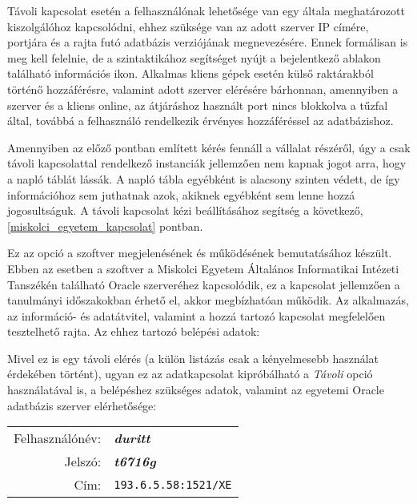 	\label{tavoli_kapcsolat}

Távoli kapcsolat esetén a felhasználónak lehetősége van egy általa meghatározott kiszolgálóhoz kapcsolódni, ehhez szüksége van az adott szerver IP címére, portjára és a rajta futó adatbázis verziójának megnevezésére. Ennek formálisan is meg kell felelnie, de a szintaktikához segítséget nyújt a bejelentkező ablakon található információs ikon. Alkalmas kliens gépek esetén külső raktárakból történő hozzáférésre, valamint adott szerver elérésére bárhonnan, amennyiben a szerver és a kliens online, az átjáráshoz használt port nincs blokkolva a tűzfal által, továbbá a felhasználó rendelkezik érvényes hozzáféréssel az adatbázishoz.\par
\setlength{\parindent}{12.5mm}Amennyiben az előző pontban említett kérés fennáll a vállalat részéről, úgy a csak távoli kapcsolattal rendelkező instanciák jellemzően nem kapnak jogot arra, hogy a napló táblát lássák. A napló tábla egyébként is alacsony szinten védett, de így információhoz sem juthatnak azok, akiknek egyébként sem lenne hozzá jogosultságuk.
\vskip 0.5cm
A távoli kapcsolat kézi beállításához segítség a következő, \ref{miskolci_egyetem_kapcsolat} pontban.


	\label{miskolci_egyetem_kapcsolat}
Ez az opció a szoftver megjelenésének és működésének bemutatásához készült. Ebben az esetben a szoftver a Miskolci Egyetem Általános Informatikai Intézeti Tanszékén található Oracle szerveréhez kapcsolódik, ez a kapcsolat jellemzően a tanulmányi időszakokban érhető el, akkor megbízhatóan működik. Az alkalmazás, az információ- és adatátvitel, valamint a hozzá tartozó kapcsolat megfelelően tesztelhető rajta.
Az ehhez tartozó belépési adatok:\par

Mivel ez is egy távoli elérés (a külön listázás csak a kényelmesebb használat érdekében történt), ugyan ez az adatkapcsolat kipróbálható a \textit{Távoli} opció használatával is, a belépéshez szükséges adatok, valamint az egyetemi Oracle adatbázis szerver elérhetősége: 

\begin{center}
\begin{tabular}{rl}
Felhasználónév: & \textit{\textbf{duritt}}\\
Jelszó: & \textit{\textbf{t6716g}}\\
Cím: & \texttt{193.6.5.58:1521/XE}
\end{tabular}
\end{center}

